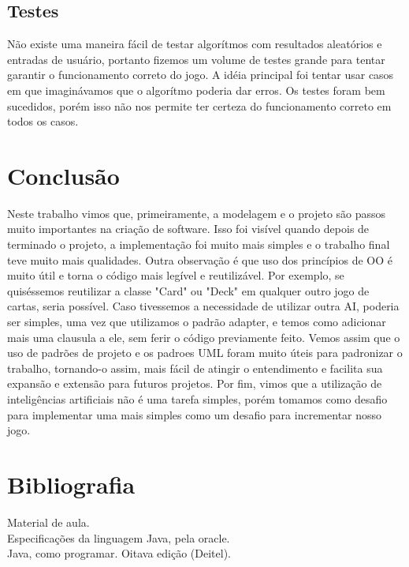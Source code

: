 \documentclass[12pt]{article}
\begin{document}
        \subsection{Testes}
        Não existe uma maneira fácil de testar algorítmos com resultados aleatórios e entradas de usuário, portanto fizemos um volume de testes grande para tentar garantir o funcionamento correto do jogo. A idéia principal foi tentar usar casos em que imaginávamos que o algorítmo poderia dar erros. Os testes foram bem sucedidos, porém isso não nos permite ter certeza do funcionamento correto em todos os casos.
		\section{Conclusão}
		Neste trabalho vimos que, primeiramente, a modelagem e o projeto são passos muito importantes na criação de
        software. Isso foi visível quando depois de terminado o projeto, a implementação foi muito mais simples e o
        trabalho final teve muito mais qualidades. Outra observação é que uso dos princípios de OO é muito útil e torna
        o código mais legível e reutilizável. Por exemplo, se quiséssemos reutilizar a classe "Card" ou "Deck" em
        qualquer outro jogo de cartas, seria possível. Caso tivessemos a necessidade de utilizar outra AI, poderia ser
        simples, uma vez que utilizamos o padrão adapter, e temos como adicionar mais uma clausula a ele, sem ferir o
        código previamente feito. Vemos assim que o uso de padrões de projeto e os padroes UML foram muito úteis para
        padronizar o trabalho, tornando-o assim, mais fácil de atingir o entendimento e facilita sua expansão e extensão
        para futuros projetos. Por fim, vimos que a utilização de inteligências artificiais não é uma tarefa simples,
        porém tomamos como desafio para implementar uma mais simples como um desafio para incrementar nosso jogo.

		\section{Bibliografia}
        Material de aula.\\
		Especificações da linguagem Java, pela oracle.\\
		Java, como programar. Oitava edição (Deitel).\\
        
\end{document}
